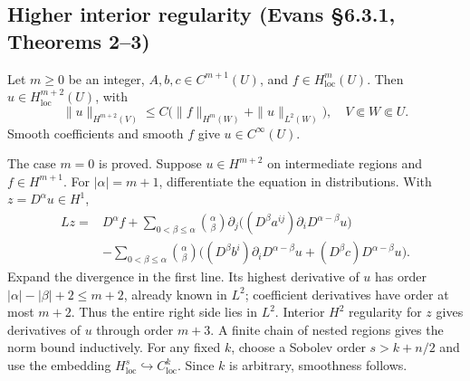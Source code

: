 \subsection{Higher interior regularity (Evans \S6.3.1, Theorems 2--3)}
\begin{theorem}\label{thm:6-higher-interior}
Let $m\geq0$ be an integer, $A,b,c\in C^{m+1}(U)$, and
$f\in H^m_{\mathrm{loc}}(U)$. Then
$u\in H^{m+2}_{\mathrm{loc}}(U)$, with
\[
 \|u\|_{H^{m+2}(V)}
 \leq C\bigl(\|f\|_{H^m(W)}+\|u\|_{L^2(W)}\bigr),
 \quad V\Subset W\Subset U.
\]
Smooth coefficients and smooth $f$ give $u\in C^\infty(U)$.
\end{theorem}
\begin{expandedproof}
The case $m=0$ is proved. Suppose $u\in H^{m+2}$ on intermediate regions
and $f\in H^{m+1}$. For $|\alpha|=m+1$, differentiate the equation
in distributions. With $z=D^\alpha u\in H^1$,
\begin{align*}
 Lz={}&D^\alpha f+
 \sum_{0<\beta\leq\alpha}\binom{\alpha}{\beta}
 \partial_j\bigl((D^\beta a^{ij})
                \partial_iD^{\alpha-\beta}u\bigr)\\
 &-\sum_{0<\beta\leq\alpha}\binom{\alpha}{\beta}
 \bigl((D^\beta b^i)\partial_iD^{\alpha-\beta}u
       +(D^\beta c)D^{\alpha-\beta}u\bigr).
\end{align*}
Expand the divergence in the first line. Its highest derivative of $u$
has order $|\alpha|-|\beta|+2\leq m+2$, already known in $L^2$;
coefficient derivatives have order at most $m+2$.
Thus the entire right side lies in $L^2$. Interior $H^2$ regularity
for $z$ gives derivatives of $u$ through order $m+3$.
A finite chain of nested regions gives the norm bound inductively.
For any fixed $k$, choose a Sobolev order $s>k+n/2$ and use the
embedding $H^s_{\mathrm{loc}}\hookrightarrow C^k_{\mathrm{loc}}$.
Since $k$ is arbitrary, smoothness follows.
\end{expandedproof}
\Needspace{45mm}

